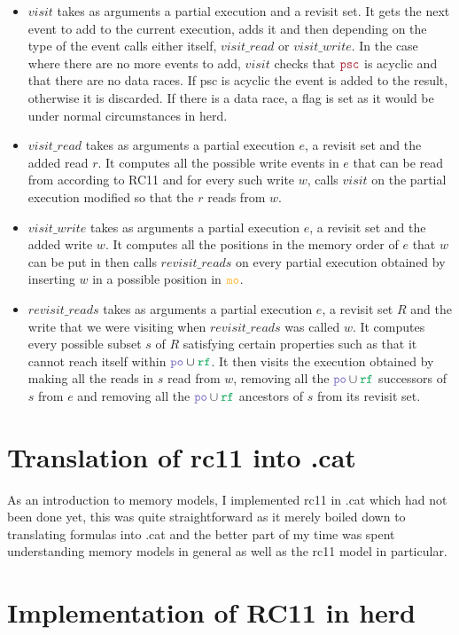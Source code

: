 \documentclass[a4,11pt]{article}
\newcommand{\mo}{\texttt{\color{Dandelion}mo}}
\newcommand{\psc}{\texttt{\color{Maroon}psc}}
\newcommand{\po}{\texttt{\color{Periwinkle}po}}
\newcommand{\rf}{\texttt{\color{Green}rf}}
\begin{document}
\begin{itemize}
\item $visit$ takes as arguments a partial execution and a revisit set. It gets the next event to add to the current execution, adds it and then depending on the type of the event calls either itself, $visit\_read$ or $visit\_write$. In the case where there are no more events to add, $visit$ checks that $\psc$ is acyclic and that there are no data races. If psc is acyclic the event is added to the result, otherwise it is discarded. If there is a data race, a flag is set as it would be under normal circumstances in herd.
\item $visit\_read$ takes as arguments a partial execution $e$, a revisit set and the added read $r$. It computes all the possible write events in $e$ that can be read from according to RC11 and for every such write $w$, calls $visit$ on the partial execution modified so that the $r$ reads from $w$.
\item $visit\_write$ takes as arguments a partial execution $e$, a revisit set and the added write $w$. It computes all the positions in the memory order of $e$ that $w$ can be put in then calls $revisit\_reads$ on every partial execution obtained by inserting $w$ in a possible position in $\mo$.
\item $revisit\_reads$ takes as arguments a partial execution $e$, a revisit set $R$ and the write that we were visiting when $revisit\_reads$ was called $w$. It computes every possible subset $s$ of $R$ satisfying certain properties such as that it cannot reach itself within $\po\cup\rf$. It then visits the execution obtained by making all the reads in $s$ read from $w$, removing all the $\po\cup \rf$ successors of $s$ from $e$ and removing all the $\po\cup\rf$ ancestors of $s$ from its revisit set.
\end{itemize}

\section{Translation of rc11 into .cat}

As an introduction to memory models, I implemented rc11 in .cat which had not been done yet, this was quite straightforward as it merely boiled down to translating formulas into .cat and the better part of my time was spent understanding memory models in general as well as the rc11 model in particular.

\section{Implementation of RC11 in herd}
\end{document}
